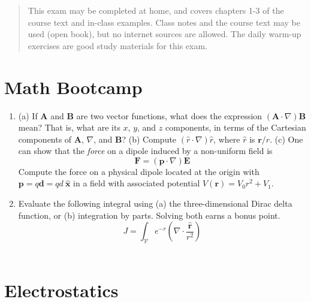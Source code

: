 \documentclass[10pt]{article}
\begin{document}
\maketitle

\begin{abstract}
This exam may be completed at home, and covers chapters 1-3 of the course text and in-class examples.  Class notes and the course text may be used (open book), but no internet sources are allowed.  The daily warm-up exercises are good study materials for this exam.
\end{abstract}
\noindent

\section{Math Bootcamp}

\begin{enumerate}
\item (a) If $\mathbf{A}$ and $\mathbf{B}$ are two vector functions, what does the expression $(\mathbf{A} \cdot \nabla) \mathbf{B}$ mean?  That is, what are its $x$, $y$, and $z$ components, in terms of the Cartesian components of $\mathbf{A}$, $\nabla$, and $\mathbf{B}$? (b) Compute $(\hat{r} \cdot \nabla) \hat{r}$, where $\hat{r}$ is $\mathbf{r}/r$. (c) One can show that the \textit{force} on a dipole induced by a non-uniform field is
\begin{equation}
\mathbf{F} = (\mathbf{p} \cdot \nabla) \mathbf{E}
\end{equation}
Compute the force on a physical dipole located at the origin with $\mathbf{p} = q \mathbf{d} = qd~\mathbf{\hat{x}}$ in a field with associated potential $V(\mathbf{r}) = V_0 r^2 + V_1$. \\ \vspace{5cm}
\item Evaluate the following integral using (a) the three-dimensional Dirac delta function, or (b) integration by parts.  Solving both earns a bonus point.
\begin{equation}
J = \int_{\mathcal{V}} e^{-r} \left( \nabla \cdot \frac{\mathbf{\hat{r}}}{r^2} \right)
\end{equation} \\ \vspace{5cm}
\end{enumerate}

\clearpage

\section{Electrostatics}
\end{document}
